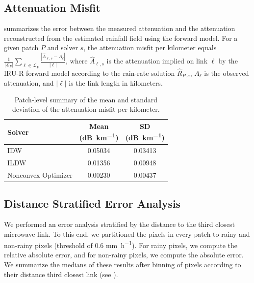 \documentclass[a4paper,fleqn]{cas-sc}
\newcommand{\notebox}[3]{%
  \begingroup
  \setlength{\fboxsep}{2pt}%
  \fcolorbox{#1}{#2}{\textsf{\footnotesize #3}}%
  \endgroup
}
\DeclareRobustCommand{\editnote}[1]{%
  \texorpdfstring{%
    \nobreak\hfill
    \mbox{\notebox{red!50!black}{red!10}{#1}}%
  }{}%
}
\begin{document}
\subsection{Attenuation Misfit}
 summarizes the error between the measured attenuation and the attenuation reconstructed from the estimated rainfall field using the forward model.
For a given patch $P$ and solver $s$, the attenuation misfit per kilometer equals $\frac{1}{|\mathcal{L}_P|}\sum_{\ell \in \mathcal{L}_P} \frac{\left|\hat{A}_{\ell,s} - A_\ell\right|}{|\ell|}$, where $\hat{A}_{\ell,s}$ is the attenuation implied on link $\ell$ by the IRU-R forward model according to the rain-rate solution $\hat{R}_{P,s}$,  $A_\ell$ is the observed attenuation, and $|\ell|$ is the link length in kilometers.
\begin{table}[!htbp]
  \centering
  \begin{tabular}{lcc}
    \toprule
    Solver              & \shortstack{Mean\\(\si{\deci\bel\per\kilo\meter})} & \shortstack{SD\\(\si{\deci\bel\per\kilo\meter})} \\
    \midrule
    IDW                 & 0.05034                                            & 0.03413                                          \\
    ILDW                & 0.01356                                            & 0.00948                                          \\
    Nonconvex Optimizer & 0.00230                                            & 0.00437                                          \\
    \bottomrule
  \end{tabular}
  \caption{Patch-level summary of the mean and standard deviation of the attenuation misfit per kilometer. }
  \label{tab:attenuation misfit}
\end{table}

\subsection{Distance Stratified  Error Analysis\editnote{GE:stable}}
We performed an error analysis stratified by the distance to the third closest microwave link. To this end, we partitioned the pixels in every patch to rainy and non-rainy pixels (threshold of $0.6$ \si{\milli\meter\per\hour}). For rainy pixels, we compute the relative absolute error, and for non-rainy pixels, we compute the absolute error. We summarize the medians of these results after binning of pixels according to their distance third closest link (see ).
\end{document}
